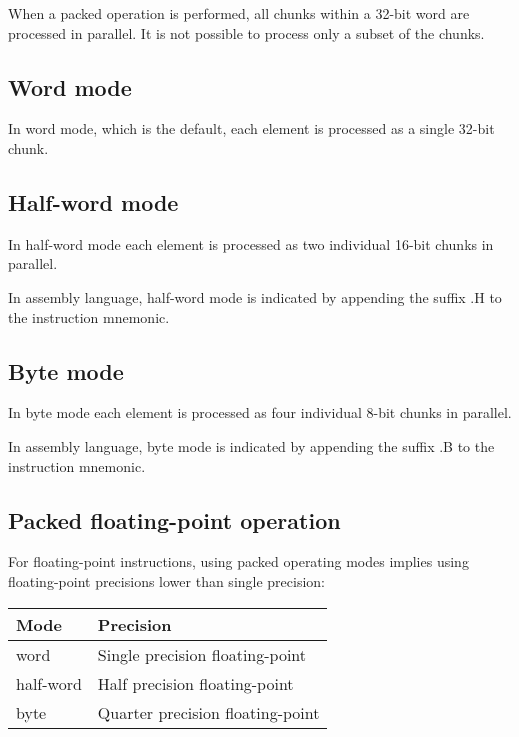 When a packed operation is performed, all chunks within a 32-bit word are
processed in parallel. It is not possible to process only a subset of the
chunks.

\subsection{Word mode}

In word mode, which is the default, each element is processed as a single
32-bit chunk.

\subsection{Half-word mode}

In half-word mode each element is processed as two individual 16-bit chunks in
parallel.

In assembly language, half-word mode is indicated by appending the suffix .H
to the instruction mnemonic.

\subsection{Byte mode}

In byte mode each element is processed as four individual 8-bit chunks in
parallel.

In assembly language, byte mode is indicated by appending the suffix .B to the
instruction mnemonic.

\subsection{Packed floating-point operation}

For floating-point instructions, using packed operating modes implies using
floating-point precisions lower than single precision:

\begin{tabular}{|l|l|}
  \hline
  \textbf{Mode} & \textbf{Precision} \\
  \hline
  word & Single precision floating-point \\
  \hline
  half-word & Half precision floating-point \\
  \hline
  byte & Quarter precision floating-point \\
  \hline
\end{tabular}
